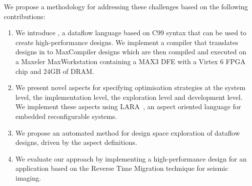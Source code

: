 We propose a methodology for addressing these challenges based on the
following contributions:
\begin{enumerate}
\item We introduce \MAXC{}, a dataflow language based on C99 syntax
  that can be used to create high-performance designs. We implement a
  compiler that translates designs in \MAXC{} to MaxCompiler
  \cite{5719584} designs which are then compiled and executed on a
  Maxeler MaxWorkstation containing a MAX3 DFE with a Virtex 6 FPGA
  chip and 24GB of DRAM.
\item We present novel aspects for specifying optimisation
  strategies at the system level, the implementation level, the
  exploration level and development level. We implement these aspects
  using
  LARA~\cite{Cardoso:Carvalho:Cutinho:Luk:Nobre:Diniz:Petrov:2012}, an
  aspect oriented language for embedded reconfigurable systems.
\item We propose an automated method for design space exploration of
  \MAXC{} dataflow designs, driven by the aspect definitions.
\item We evaluate our approach by implementing a high-performance
  design for an application based on the Reverse Time Migration
  technique for seismic imaging.
\end{enumerate}

